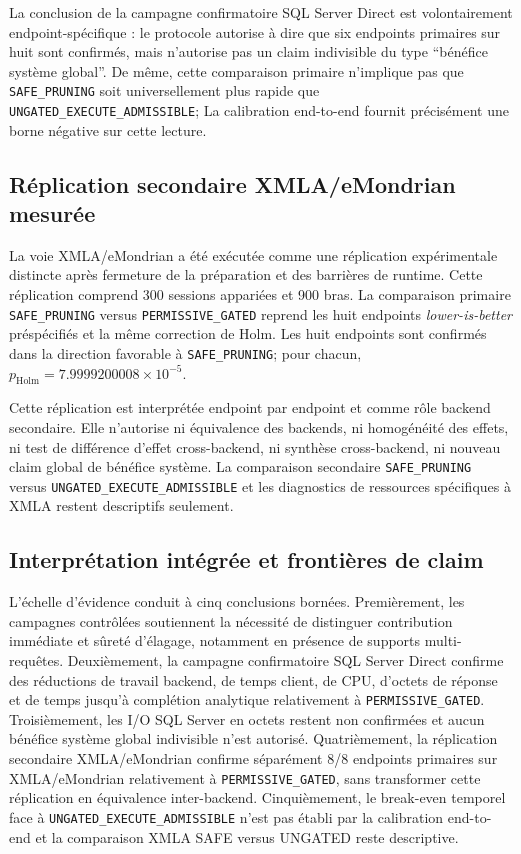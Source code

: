 \documentclass[journal]{IEEEtran}
\begin{document}
La conclusion de la campagne confirmatoire SQL Server Direct est volontairement endpoint-spécifique : le protocole autorise à dire que six endpoints primaires sur huit sont confirmés, mais n'autorise pas un claim indivisible du type ``bénéfice système global''. De même, cette comparaison primaire n'implique pas que \texttt{SAFE\_PRUNING} soit universellement plus rapide que \texttt{UNGATED\_EXECUTE\_ADMISSIBLE}; La calibration end-to-end fournit précisément une borne négative sur cette lecture.

\subsection{Réplication secondaire XMLA/eMondrian mesurée}

La voie XMLA/eMondrian a été exécutée comme une réplication expérimentale distincte après fermeture de la préparation et des barrières de runtime. Cette réplication comprend 300 sessions appariées et 900 bras. La comparaison primaire \texttt{SAFE\_PRUNING} versus \texttt{PERMISSIVE\_GATED} reprend les huit endpoints \emph{lower-is-better} préspécifiés et la même correction de Holm. Les huit endpoints sont confirmés dans la direction favorable à \texttt{SAFE\_PRUNING}; pour chacun, $p_{\mathrm{Holm}}=7.9999200008\times 10^{-5}$.



Cette réplication est interprétée endpoint par endpoint et comme rôle backend secondaire. Elle n'autorise ni équivalence des backends, ni homogénéité des effets, ni test de différence d'effet cross-backend, ni synthèse cross-backend, ni nouveau claim global de bénéfice système. La comparaison secondaire \texttt{SAFE\_PRUNING} versus \texttt{UNGATED\_EXECUTE\_ADMISSIBLE} et les diagnostics de ressources spécifiques à XMLA restent descriptifs seulement.

\subsection{Interprétation intégrée et frontières de claim}

L'échelle d'évidence conduit à cinq conclusions bornées. Premièrement, les campagnes contrôlées soutiennent la nécessité de distinguer contribution immédiate et sûreté d'élagage, notamment en présence de supports multi-requêtes. Deuxièmement, la campagne confirmatoire SQL Server Direct confirme des réductions de travail backend, de temps client, de CPU, d'octets de réponse et de temps jusqu'à complétion analytique relativement à \texttt{PERMISSIVE\_GATED}. Troisièmement, les I/O SQL Server en octets restent non confirmées et aucun bénéfice système global indivisible n'est autorisé. Quatrièmement, la réplication secondaire XMLA/eMondrian confirme séparément 8/8 endpoints primaires sur XMLA/eMondrian relativement à \texttt{PERMISSIVE\_GATED}, sans transformer cette réplication en équivalence inter-backend. Cinquièmement, le break-even temporel face à \texttt{UNGATED\_EXECUTE\_ADMISSIBLE} n'est pas établi par la calibration end-to-end et la comparaison XMLA SAFE versus UNGATED reste descriptive.
\end{document}
